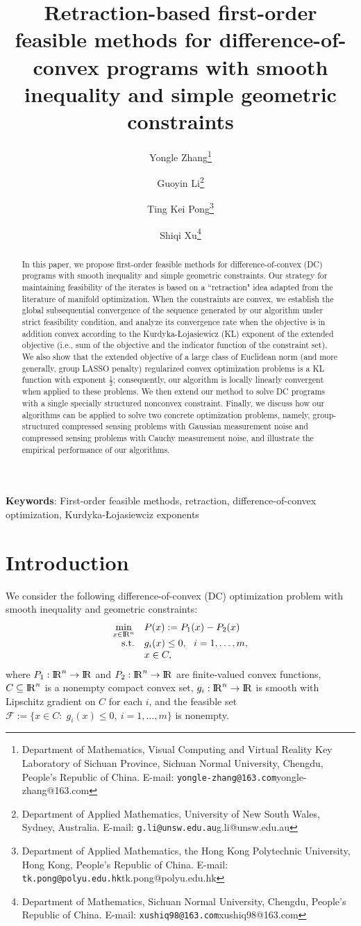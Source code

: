 \documentclass[10pt]{article}
\title{\sf Retraction-based first-order feasible methods for difference-of-convex programs with smooth inequality and simple geometric constraints}
\author{
Yongle Zhang\thanks{
        Department of Mathematics, Visual Computing and Virtual Reality Key Laboratory of Sichuan Province, Sichuan Normal University, Chengdu, People's Republic of China.
        E-mail: \texttt{yongle-zhang@163.com}{yongle-zhang@163.com}}
\and
Guoyin Li\thanks{
        Department of Applied Mathematics, University of New South Wales, Sydney, Australia.
        E-mail: \texttt{g.li@unsw.edu.au}{g.li@unsw.edu.au}}
\and
Ting Kei Pong\thanks{
		Department of Applied Mathematics, the Hong Kong Polytechnic University, Hong Kong, People's Republic of China.
		E-mail: \texttt{tk.pong@polyu.edu.hk}{tk.pong@polyu.edu.hk}}
\and
Shiqi Xu\thanks{
        Department of Mathematics, Sichuan Normal University, Chengdu, People's Republic of China.
        E-mail: \texttt{xushiq98@163.com}{xushiq98@163.com}}
}
\numberwithin{equation}{section}
\def\R{{\rm I\!R}}
\begin{document}
\maketitle

\begin{abstract}
  In this paper, we propose first-order feasible methods for difference-of-convex (DC) programs with smooth inequality and simple geometric constraints. Our strategy for maintaining feasibility of the iterates is based on a ``retraction" idea adapted from the literature of manifold optimization. When the constraints are convex, we establish the global subsequential convergence of the sequence generated by our algorithm under strict feasibility condition, and analyze its convergence rate when the objective is in addition convex according to the Kurdyka-{\L}ojasiewicz (KL) exponent of the extended objective (i.e., sum of the objective and the indicator function of the constraint set). We also show that the extended objective of a large class of Euclidean norm (and more generally, group LASSO penalty) regularized convex optimization problems is a KL function with exponent $\frac12$; consequently, our algorithm is locally linearly convergent when applied to these problems. We then extend our method to solve DC programs with a single specially structured nonconvex constraint. Finally, we discuss how our algorithms can be applied to solve two concrete optimization problems, namely, group-structured compressed sensing problems with Gaussian measurement noise and compressed sensing problems with Cauchy measurement noise, and illustrate the empirical performance of our algorithms.
\end{abstract}

{\small
{\bf Keywords}: First-order feasible methods, retraction, difference-of-convex optimization, Kurdyka-{\L}ojasiewciz exponents
}

\section{Introduction}
We consider the following difference-of-convex (DC) optimization problem with smooth inequality and geometric constraints:
\begin{equation}\label{P0}
  \begin{array}{rl}
\min\limits_{x\in\R^n} & P(x) := P_1(x) - P_2(x)\\
{\rm s.t.} & g_i(x)\leq 0,~~ i = 1,\ldots, m,\\
           & x\in C,
  \end{array}
\end{equation}
where $P_1:\R^n\rightarrow\R$ and $P_2:\R^n\rightarrow\R$ are {\color{blue}finite-valued convex} functions, $C\subseteq \R^n$ is a nonempty compact convex set, $g_i:\R^n\rightarrow\R$ is smooth with Lipschitz gradient on $C$ for each $i$, and the feasible set $\mathcal{F} :=\{x\in C:\; g_i(x)\le 0, ~ i = 1,\ldots, m\}$ is nonempty.
\end{document}
